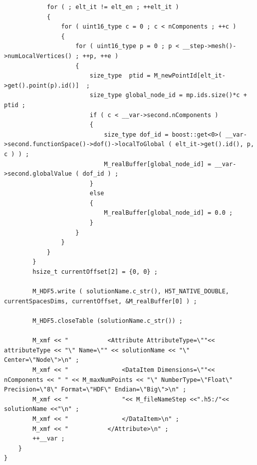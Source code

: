 \documentclass[12pt]{article}
\begin{document}
\begin{lstlisting}
            for ( ; elt_it != elt_en ; ++elt_it )
            {
                for ( uint16_type c = 0 ; c < nComponents ; ++c )
                {
                    for ( uint16_type p = 0 ; p < __step->mesh()->numLocalVertices() ; ++p, ++e )
                    {
                        size_type  ptid = M_newPointId[elt_it->get().point(p).id()]  ;
                        size_type global_node_id = mp.ids.size()*c + ptid ;
                        if ( c < __var->second.nComponents ) 
                        {
                            size_type dof_id = boost::get<0>( __var->second.functionSpace()->dof()->localToGlobal ( elt_it->get().id(), p, c ) ) ;
                            M_realBuffer[global_node_id] = __var->second.globalValue ( dof_id ) ;
                        }
                        else
                        {
                            M_realBuffer[global_node_id] = 0.0 ;
                        }
                    }
                }
            }
        }    
        hsize_t currentOffset[2] = {0, 0} ;

        M_HDF5.write ( solutionName.c_str(), H5T_NATIVE_DOUBLE, currentSpacesDims, currentOffset, &M_realBuffer[0] ) ;

        M_HDF5.closeTable (solutionName.c_str()) ;    

        M_xmf << "           <Attribute AttributeType=\""<< attributeType << "\" Name=\"" << solutionName << "\" Center=\"Node\">\n" ;
        M_xmf << "               <DataItem Dimensions=\""<< nComponents << " " << M_maxNumPoints << "\" NumberType=\"Float\" Precision=\"8\" Format=\"HDF\" Endian=\"Big\">\n" ;
        M_xmf << "               "<< M_fileNameStep <<".h5:/"<< solutionName <<"\n" ;
        M_xmf << "               </DataItem>\n" ;    
        M_xmf << "           </Attribute>\n" ;
        ++__var ;
    }
}
\end{lstlisting}
\newpage
\end{document}
